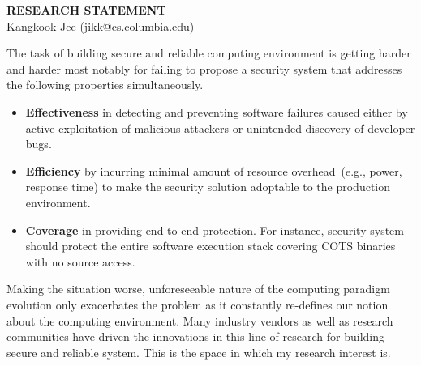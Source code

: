 \documentclass[letterpaper, 10pt]{article}
\begin{document}
\begin{small}

\begin{center}
{\LARGE \bf RESEARCH STATEMENT}\\
\vspace*{0.1cm}
{\normalsize Kangkook Jee (jikk@cs.columbia.edu)}
\end{center}



The task of building secure and reliable computing environment is getting
harder and harder most notably for failing to propose a security system that
addresses the following properties simultaneously.

\begin{itemize}

        \item {\bf Effectiveness} in detecting and preventing software failures
                caused either by active exploitation of malicious attackers or
                unintended discovery of developer bugs.

        \item {\bf Efficiency} by incurring minimal amount of resource
                overhead~(e.g., power, response time) to make the security
                solution adoptable to the production environment.

        \item {\bf Coverage} in providing end-to-end protection. For instance,
                security system should protect the entire software execution
                stack covering COTS binaries with no source access.

\end{itemize}

Making the situation worse, unforeseeable nature of the computing paradigm
evolution only exacerbates the problem as it constantly re-defines our notion
about the computing environment.
%
Many industry vendors as well as research communities have driven the
innovations in this line of research for building secure and reliable system.
This is the space in which my research interest is.


\end{small}
\end{document}
